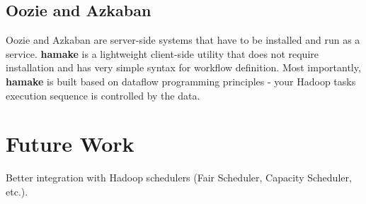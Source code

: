 \documentclass{article}
\begin{document}
\subsection*{Oozie and Azkaban}

Oozie and Azkaban are server-side systems that have to be installed
and run as a service. \textbf{hamake} is a lightweight client-side utility that
does not require installation and has very simple syntax for workflow
definition.  Most importantly, \textbf{hamake} is built based on dataflow
programming principles - your Hadoop tasks execution sequence is
controlled by the data.
 

\section{Future Work}

Better integration with Hadoop schedulers (Fair Scheduler, Capacity
Scheduler, etc.).

\nocite{*}


\end{document}
